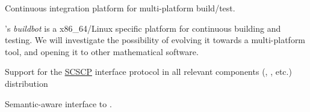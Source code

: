 \begin{workpackage}[id=component-architecture,wphases=0-48!.5,
  title=Component Architecture,lead=UV,
  PSRM=24,UVRM=8,SARM=16, USHRM=4]
\begin{wpdelivs}
\begin{wpdeliv}[due=24,id=portability-cygwin64,dissem=PU,nature=OTHER]
    \end{wpdeliv}

    \begin{wpdeliv}[due=36,id=multiplatform-buildbot,dissem=PP,nature=DEM]
      {Continuous integration platform for multi-platform build/test.}

      \Sage's \emph{buildbot} is a x86\_64/Linux specific platform for
      continuous building and testing. We will investigate the
      possibility of evolving it towards a multi-platform tool, and
      opening it to other mathematical software.
    \end{wpdeliv}%
    \begin{wpdeliv}[due=12,id=scscp-sage,dissem=PU,nature=OTHER]
      {Support for the \href{http://www.symbolic-computing.org/}{SCSCP} interface protocol
        in all relevant components (\Sage, \GAP, etc.) distribution}
    \end{wpdeliv}

    \begin{wpdeliv}[due=36,id=semantic-interface-sage-gap,dissem=PU,nature=OTHER]
      {Semantic-aware \Sage interface to \GAP.}
    \end{wpdeliv}


\end{wpdelivs}
\end{workpackage}
